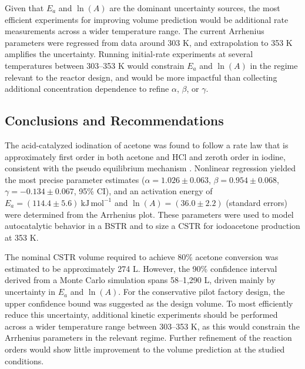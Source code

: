 \documentclass{article}
\begin{document}
Given that $E_a$ and $\ln(A)$ are the dominant uncertainty sources, the most efficient experiments for improving volume prediction would be additional rate measurements across a wider temperature range. The current Arrhenius parameters were regressed from data around 303 K, and extrapolation to 353 K amplifies the uncertainty. Running initial-rate experiments at several temperatures between 303--353 K would constrain $E_a$ and $\ln(A)$ in the regime relevant to the reactor design, and would be more impactful than collecting additional concentration dependence to refine $\alpha$, $\beta$, or $\gamma$.








\subsection{Conclusions and Recommendations}

The acid-catalyzed iodination of acetone was found to follow a rate law that is approximately first order in both acetone and HCl and zeroth order in iodine, consistent with the pseudo equilibrium mechanism \autocite{dongxia}. Nonlinear regression yielded the most precise parameter estimates ($\alpha = 1.026 \pm 0.063$, $\beta = 0.954 \pm 0.068$, $\gamma = -0.134 \pm 0.067$, 95\% CI), and an activation energy of $E_a = (114.4 \pm 5.6) \ \mathrm{kJ \, mol^{-1}}$ and $\ln(A) = (36.0 \pm 2.2)$ (standard errors) were determined from the Arrhenius plot. These parameters were used to model autocatalytic behavior in a BSTR and to size a CSTR for iodoacetone production at 353 K.

The nominal CSTR volume required to achieve 80\% acetone conversion was estimated to be approximately 274 L. However, the 90\% confidence interval derived from a Monte Carlo simulation spans 58--1,290 L, driven mainly by uncertainty in $E_a$ and $\ln(A)$. For the conservative pilot factory design, the upper confidence bound was suggested as the design volume. To most efficiently reduce this uncertainty, additional kinetic experiments should be performed across a wider temperature range between 303--353 K, as this would constrain the Arrhenius parameters in the relevant regime. Further refinement of the reaction orders would show little improvement to the volume prediction at the studied conditions.



\printbibliography


\end{document}
